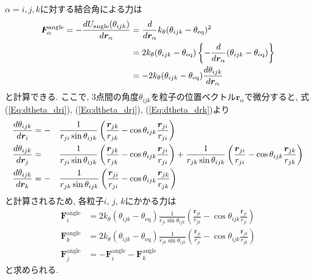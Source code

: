 $\alpha = i,j,k$に対する結合角による力は
\begin{align}
   \bm{F}_{\alpha}^{\mathrm{angle}}
   =
   -
   \frac{d U_{\mathrm{angle}}(\theta_{ijk})}{d \bm{r}_{\alpha}}
   &=
   \frac{d}{d \bm{r}_{\alpha}}
   k_{\theta} (\theta_{ijk} - \theta_{\mathrm{eq}})^{2}
   \notag \\
   &=
   2 k_{\theta} (\theta_{ijk} - \theta_{\mathrm{eq}})
   \left\{
        - \frac{d}{d \bm{r}_{\alpha}}
         (\theta_{ijk} - \theta_{\mathrm{eq}})
   \right\}
 \notag \\
   &=
   -
   2 k_{\theta} (\theta_{ijk} - \theta_{\mathrm{eq}})
      \frac{d \theta_{ijk}}{d \bm{r}_{\alpha}}
   \notag
\end{align}
と計算できる. ここで, 3点間の角度$\theta_{ijk}$を粒子の位置ベクトル$\bm{r}_{\alpha}$で微分すると, 式(\ref{Eq:dtheta_dri}), (\ref{Eq:dtheta_drj}), (\ref{Eq:dtheta_drk})より
\begin{alignat}{3}
   \frac{d \theta_{ijk}}{d \bm{r}_{i}}
   &=
   -&&
   \frac{1}{r_{ji} \sin\theta_{ijk}}
   \left(
            \frac{\bm{r}_{jk}}{r_{jk}}
          - \cos\theta_{ijk} \frac{\bm{r}_{ji}}{r_{ji}}
   \right)
   \notag
   \\
   \frac{d \theta_{ijk}}{d \bm{r}_{j}}
   &=&&
   \frac{1}{r_{ji} \sin\theta_{ijk}}
   \left(
            \frac{\bm{r}_{jk}}{r_{jk}}
          - \cos\theta_{ijk} \frac{\bm{r}_{ji}}{r_{ji}}
   \right)
   +
   \frac{1}{r_{jk} \sin\theta_{ijk}}
   \left(
            \frac{\bm{r}_{ji}}{r_{ji}}
          - \cos\theta_{ijk} \frac{\bm{r}_{jk}}{r_{jk}}
   \right)
   \notag
   \\
   \frac{d \theta_{ijk}}{d \bm{r}_{k}}
   &=
   -&&
   \frac{1}{r_{jk} \sin\theta_{ijk}}
   \left(
           \frac{\bm{r}_{ji}}{r_{ji}}
         - \cos\theta_{ijk} \frac{\bm{r}_{jk}}{r_{jk}}
   \right)
   \notag
\end{alignat}
と計算されるため, 各粒子$i$, $j$, $k$にかかる力は
\begin{align}
   \bm{F}_{i}^{\mathrm{angle}}
   &=
   2 k_{\theta} (\theta_{ijk} - \theta_{\mathrm{eq}})
   \frac{1}{r_{ji} \sin\theta_{ijk}}
   \left(
            \frac{\bm{r}_{jk}}{r_{jk}}
          - \cos\theta_{ijk} \frac{\bm{r}_{ji}}{r_{ji}}
   \right)
   \\
   \bm{F}_{k}^{\mathrm{angle}}
   &=
   2 k_{\theta} (\theta_{ijk} - \theta_{\mathrm{eq}})
   \frac{1}{r_{jk} \sin\theta_{ijk}}
   \left(
           \frac{\bm{r}_{ji}}{r_{ji}}
         - \cos\theta_{ijk} \frac{\bm{r}_{jk}}{r_{jk}}
   \right)
   \\
   \bm{F}_{j}^{\mathrm{angle}}
   &=
   - \bm{F}_{i}^{\mathrm{angle}} - \bm{F}_{k}^{\mathrm{angle}}
\end{align}
と求められる.

